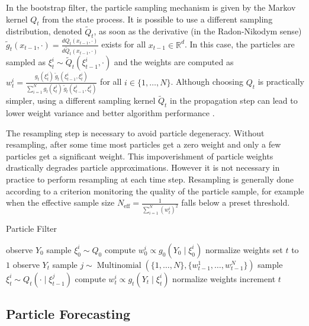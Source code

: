 \documentclass{article}
\newcommand{\R}{\mathbb R}
\begin{document}
In the bootstrap filter, the particle sampling mechanism is given by the Markov kernel $Q_t$ from the state process. It is possible to use a different sampling distribution, denoted $\tilde Q_t$, as soon as the derivative (in the Radon-Nikodym sense) $\tilde g_t(x_{t-1},\cdot) = \displaystyle \frac{dQ_t(x_{t-1},\cdot)}{d\tilde Q_t(x_{t-1},\cdot)}$ exists for all $x_{t-1} \in \R^d$. In this case, the particles are sampled as $\displaystyle \xi^i_t \sim \tilde Q_t(\xi^i_{t-1},\cdot)$ and the weights are computed as $\displaystyle w^i_t = \frac{g_t(\xi^i_t) \, \tilde g_t(\xi^i_{t-1},\xi^i_t)}{\sum_{i=1}^N g_t(\xi^i_t) \, \tilde g_t(\xi^i_{t-1},\xi^i_t)}$ for all $i \in \{1,\dots,N\}$. Although choosing $Q_t$ is practically simpler, using a different sampling kernel $\tilde Q_t$ in the propagation step can lead to lower weight variance and better algorithm performance \cite{Cappe2007, Doucet2000, Doucet2011}.

The resampling step is necessary to avoid particle degeneracy. Without resampling, after some time most particles get a zero weight and only a few particles get a significant weight. This impoverishment of particle weights drastically degrades particle approximations. However it is not necessary in practice to perform resampling at each time step. Resampling is generally done according to a criterion monitoring the quality of the particle sample, for example when the effective sample size $\displaystyle N_\text{eff} = \frac{1}{\sum_{i=1}^N (w^i_t)^2}$ falls below a preset threshold.

\begin{algorithm}
\caption{Particle Filter}
\label{algo:pf}
\begin{algorithmic}
  \State observe $Y_0$
    \State sample $\xi^i_0 \sim Q_0$
    \State compute $w^i_0 \propto g_0(Y_0 \mid \xi^i_0)$
  \EndFor
  \State normalize weights
  \State set $t$ to $1$
  \Loop
    \State observe $Y_t$
      \State sample $j \sim \operatorname{Multinomial}(\{1,\dots,N\}, \{w^1_{t-1},\dots,w^N_{t-1}\})$ 
      \State sample $\xi^i_t \sim Q_t(\cdot \mid \xi^j_{t-1})$ 
      \State compute $w^i_t \propto g_t(Y_t \mid \xi^i_t)$ 
    \EndFor
    \State normalize weights
    \State increment $t$
  \EndLoop
\end{algorithmic}
\end{algorithm}

\subsection{Particle Forecasting}
\end{document}
